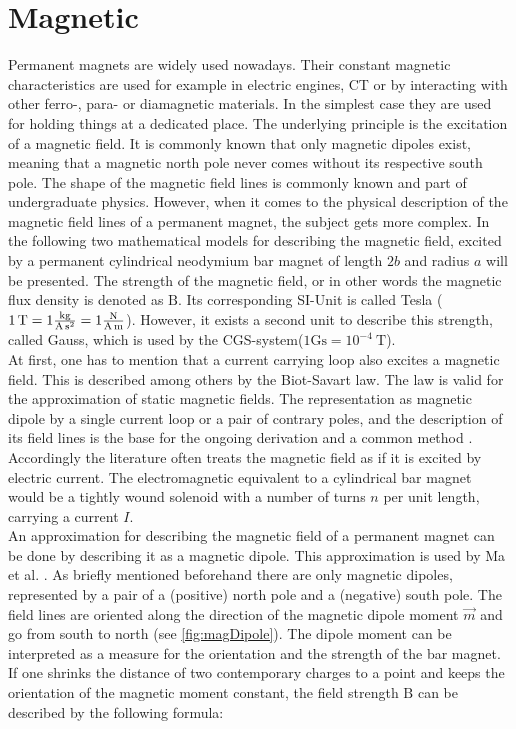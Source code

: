 \section{Magnetic} \label{sec:magneticFound}
Permanent magnets are widely used nowadays. Their constant magnetic characteristics are used for example in electric engines, \ac{CT} or by interacting with other ferro-, para- or diamagnetic materials. In the simplest case they are used for holding things at a dedicated place. The underlying principle is the excitation of a magnetic field. It is commonly known that only magnetic dipoles exist, meaning that a magnetic north pole never comes without its respective south pole. The shape of the magnetic field lines is commonly known and part of undergraduate physics. However, when it comes to the physical description of the magnetic field lines of a permanent magnet, the subject gets more complex. In the following two mathematical models for describing the magnetic field, excited by a permanent cylindrical neodymium bar magnet of length $ 2b $ and radius $ a $ will be presented. The strength of the magnetic field, or in other words the magnetic flux density is denoted as $ \mathrm{B} $. Its corresponding SI-Unit is called Tesla ($ \SI{1}{\tesla} = 1 \si[per-mode=fraction]{\kilogram \per \ampere \per \second \squared} = 1 \si[per-mode=fraction]{\newton \per \ampere \per \meter}$). However, it exists a second unit to describe this strength, called Gauss, which is used by the \ac{CGS}-system($ 1 \mathrm{Gs} = 10^{-4}\SI{}{\tesla} $). \\
At first, one has to mention that a current carrying loop also excites a magnetic field. This is described among others by the Biot-Savart law. The law is valid for the approximation of static magnetic fields. The representation as magnetic dipole by a single current loop or a pair of contrary poles, and the description of its field lines is the base for the ongoing derivation and a common method \cite{derby2010cylindrical}. Accordingly the literature often treats the magnetic field as if it is excited by electric current. The electromagnetic equivalent to a cylindrical bar magnet would be a tightly wound solenoid with a number of turns $ n $ per unit length, carrying a current $ I $.\\
An approximation for describing the magnetic field of a permanent magnet can be done by describing it as a magnetic dipole. This approximation is used by Ma et al. \cite{ma2010magnetic}. As briefly mentioned beforehand there are only magnetic dipoles, represented by a pair of a (positive) north pole and a (negative) south pole. The field lines are oriented along the direction of the magnetic dipole moment $ \vec{m} $ and go from south to north (see \ref{fig:magDipole}). The dipole moment can be interpreted as a measure for the orientation and the strength of the bar magnet. If one shrinks the distance of two contemporary charges to a point and keeps the orientation of the magnetic moment constant, the field strength $ \mathrm{B} $ can be described by the following formula:
